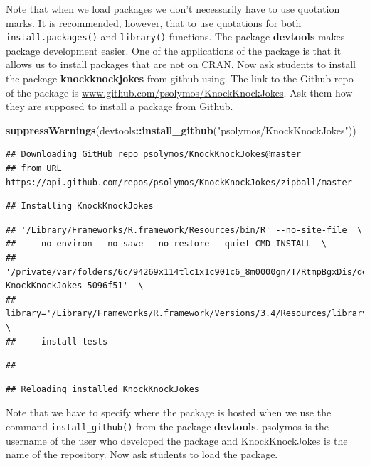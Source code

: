 \documentclass[]{book}
\newenvironment{Shaded}{\begin{snugshade}}{\end{snugshade}}
\newcommand{\KeywordTok}[1]{\textcolor[rgb]{0.13,0.29,0.53}{\textbf{#1}}}
\newcommand{\NormalTok}[1]{#1}
\newcommand{\OperatorTok}[1]{\textcolor[rgb]{0.81,0.36,0.00}{\textbf{#1}}}
\newcommand{\StringTok}[1]{\textcolor[rgb]{0.31,0.60,0.02}{#1}}
\begin{document}
Note that when we load packages we don't necessarily have to use quotation marks. It is recommended, however, that to use quotations for both \texttt{install.packages()} and \texttt{library()} functions. The package \textbf{devtools} makes package development easier. One of the applications of the package is that it allows us to install packages that are not on CRAN. Now ask students to install the package \textbf{knockknockjokes} from github using. The link to the Github repo of the package is \url{www.github.com/psolymos/KnockKnockJokes}. Ask them how they are supposed to install a package from Github.

\begin{Shaded}
\begin{Highlighting}[]
\KeywordTok{suppressWarnings}\NormalTok{(devtools}\OperatorTok{::}\KeywordTok{install_github}\NormalTok{(}\StringTok{"psolymos/KnockKnockJokes"}\NormalTok{))}
\end{Highlighting}
\end{Shaded}

\begin{verbatim}
## Downloading GitHub repo psolymos/KnockKnockJokes@master
## from URL https://api.github.com/repos/psolymos/KnockKnockJokes/zipball/master
\end{verbatim}

\begin{verbatim}
## Installing KnockKnockJokes
\end{verbatim}

\begin{verbatim}
## '/Library/Frameworks/R.framework/Resources/bin/R' --no-site-file  \
##   --no-environ --no-save --no-restore --quiet CMD INSTALL  \
##   '/private/var/folders/6c/94269x114tlc1x1c901c6_8m0000gn/T/RtmpBgxDis/devtools11d1c3049467f/psolymos-KnockKnockJokes-5096f51'  \
##   --library='/Library/Frameworks/R.framework/Versions/3.4/Resources/library'  \
##   --install-tests
\end{verbatim}

\begin{verbatim}
## 
\end{verbatim}

\begin{verbatim}
## Reloading installed KnockKnockJokes
\end{verbatim}

Note that we have to specify where the package is hosted when we use the command \texttt{install\_github()} from the package \textbf{devtools}. psolymos is the username of the user who developed the package and KnockKnockJokes is the name of the repository. Now ask students to load the package.
\end{document}

